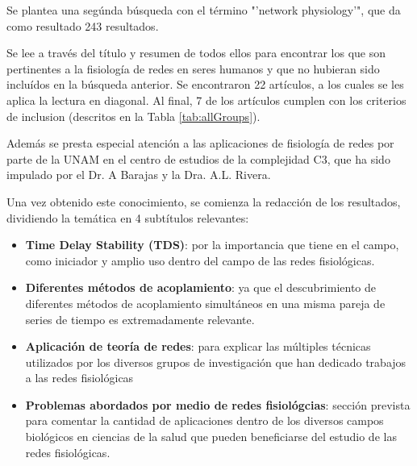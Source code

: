 \documentclass[twoside,twocolumn]{article}
\begin{document}
Se plantea una segúnda búsqueda con el término "'network physiology'", que da como resultado 243 resultados.

Se lee a través del título y resumen de todos ellos para  encontrar los que son pertinentes a la fisiología de redes en seres humanos y que no hubieran sido incluídos en la búsqueda anterior. Se encontraron 22 artículos, a los cuales se les aplica la lectura en diagonal.
Al final, 7 de los artículos cumplen con los criterios de inclusion (descritos en la Tabla \ref{tab:allGroups}).

Además se presta especial atención a las aplicaciones de fisiología de redes por parte de la UNAM en el centro de estudios de la complejidad C3, que ha sido impulado por el Dr. A Barajas y la Dra. A.L. Rivera.

Una vez obtenido este conocimiento, se comienza la redacción de los resultados, dividiendo la temática en 4 subtítulos relevantes:
\begin{itemize}
  \item \textbf{Time Delay Stability (TDS)}: por la importancia que tiene en el campo, como iniciador y amplio uso dentro del campo de las redes fisiológicas.
  \item \textbf{Diferentes métodos de acoplamiento}: ya que el descubrimiento de diferentes métodos de acoplamiento simultáneos en una misma pareja de series de tiempo es extremadamente relevante.
  \item \textbf{Aplicación de teoría de redes}: para explicar las múltiples técnicas utilizados por los diversos grupos de investigación que han dedicado trabajos a las redes fisiológicas
  \item \textbf{Problemas abordados por medio de redes fisiológcias}: sección prevista para comentar la cantidad de aplicaciones dentro de los diversos campos biológicos en ciencias de la salud que pueden beneficiarse del estudio de las redes fisiológicas.
\end{itemize}

\end{document}
